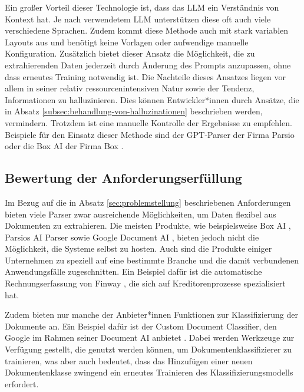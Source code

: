 Ein großer Vorteil dieser Technologie ist, dass das \gls{LLM} ein Verständnis von Kontext hat. Je nach verwendetem \gls{LLM} unterstützen diese oft auch viele verschiedene Sprachen. Zudem kommt diese Methode auch mit stark variablen Layouts aus und benötigt keine Vorlagen oder aufwendige manuelle Konfiguration. Zusätzlich bietet dieser Ansatz die Möglichkeit, die zu extrahierenden Daten jederzeit durch Änderung des Prompts anzupassen, ohne dass erneutes Training notwendig ist. Die Nachteile dieses Ansatzes liegen vor allem in seiner relativ ressourcenintensiven Natur sowie der Tendenz, Informationen zu halluzinieren. Dies können Entwickler*innen durch Ansätze, die in Absatz \ref{subsec:behandlung-von-halluzinationen} beschrieben werden, vermindern. Trotzdem ist eine manuelle Kontrolle der Ergebnisse zu empfehlen. Beispiele für den Einsatz dieser Methode sind der GPT-Parser der Firma Parsio \parencite{parsio_pdf_extraction} oder die Box AI der Firma Box \parencite{box_ai}.

\subsection{Bewertung der Anforderungserfüllung}
\label{subsec:bewertung-im-bezug-auf-die-anforderungen}

Im Bezug auf die in Absatz \ref{sec:problemstellung} beschriebenen Anforderungen bieten viele Parser zwar ausreichende Möglichkeiten, um Daten flexibel aus Dokumenten zu extrahieren. Die meisten Produkte, wie beispielsweise Box AI \parencite{box_ai}, Parsios AI Parser \parencite{parsio_pdf_extraction} sowie Google Document AI \parencite{google_documentAI}, bieten jedoch nicht die Möglichkeit, die Systeme selbst zu hosten. Auch sind die Produkte einiger Unternehmen zu speziell auf eine bestimmte Branche und die damit verbundenen Anwendungsfälle zugeschnitten. Ein Beispiel dafür ist die automatische Rechnungserfassung von Finway \parencite{finway_automatische_rechnungserfassung}, die sich auf Kreditorenprozesse spezialisiert hat.

Zudem bieten nur manche der Anbieter*innen Funktionen zur Klassifizierung der Dokumente an. Ein Beispiel dafür ist der Custom Document Classifier, den Google im Rahmen seiner Document AI anbietet \parencite{google_documentAiCustomClassifier}. Dabei werden Werkzeuge zur Verfügung gestellt, die genutzt werden können, um Dokumentenklassifizierer zu trainieren, was aber auch bedeutet, dass das Hinzufügen einer neuen Dokumentenklasse zwingend ein erneutes Trainieren des Klassifizierungsmodells erfordert.

